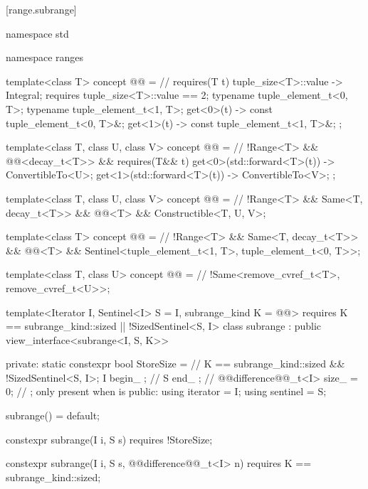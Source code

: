 {[range.subrange]{}

%
\begin{codeblock}
namespace std { namespace ranges {
    template<class T>
    concept @@ = // \expos
      requires(T t) {
        { tuple_size<T>::value } -> Integral;
        requires tuple_size<T>::value == 2;
        typename tuple_element_t<0, T>;
        typename tuple_element_t<1, T>;
        { get<0>(t) } -> const tuple_element_t<0, T>&;
        { get<1>(t) } -> const tuple_element_t<1, T>&;
      };

    template<class T, class U, class V>
    concept @@ = // \expos
      !Range<T> && @@<decay_t<T>> &&
      requires(T&& t) {
        { get<0>(std::forward<T>(t)) } -> ConvertibleTo<U>;
        { get<1>(std::forward<T>(t)) } -> ConvertibleTo<V>;
      };

    template<class T, class U, class V>
    concept @@ = // \expos
      !Range<T> && Same<T, decay_t<T>> && @@<T> &&
      Constructible<T, U, V>;

    template<class T>
    concept @@ = // \expos
      !Range<T> && Same<T, decay_t<T>> && @@<T> &&
      Sentinel<tuple_element_t<1, T>, tuple_element_t<0, T>>;

    template<class T, class U>
    concept @@ = // \expos
      !Same<remove_cvref_t<T>, remove_cvref_t<U>>;

    template<Iterator I, Sentinel<I> S = I, subrange_kind K =
        @\oldtxt{\seebelow}@>
      requires K == subrange_kind::sized || !SizedSentinel<S, I>
    class subrange : public view_interface<subrange<I, S, K>> {
    private:
      static constexpr bool StoreSize =  // \expos
        K == subrange_kind::sized && !SizedSentinel<S, I>;
      I begin_ {}; // \expos
      S end_ {};   // \expos
      @@difference@@_t<I> size_ = 0; // \expos; only present when  is 
    public:
      using iterator = I;
      using sentinel = S;

      subrange() = default;

      constexpr subrange(I i, S s) requires !StoreSize;

      constexpr subrange(I i, S s, @@difference@@_t<I> n)
        requires K == subrange_kind::sized;

}}}
\end{codeblock}}
